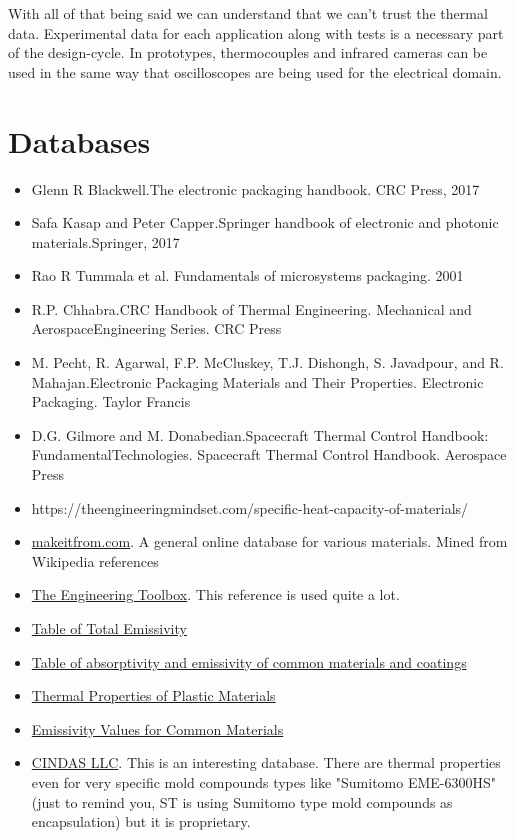 \documentclass[final]{cubedoc}
\begin{document}
	With all of that being said we can understand that we can't trust the thermal data. Experimental data for each application along with tests is a necessary part of the design-cycle. In prototypes, thermocouples and infrared cameras can be used in the same way that oscilloscopes are being used for the electrical domain.
	
	\section{Databases}\label{Databases}
	
	\begin{itemize}
		\item Glenn R Blackwell.The electronic packaging handbook.  CRC Press, 2017
		\item Safa Kasap and Peter Capper.Springer handbook of electronic and photonic materials.Springer, 2017
		\item Rao R Tummala et al.  Fundamentals of microsystems packaging.  2001
		\item R.P.  Chhabra.CRC Handbook of Thermal Engineering.   Mechanical  and  AerospaceEngineering Series. CRC Press
		\item  M. Pecht, R. Agarwal, F.P. McCluskey, T.J. Dishongh, S. Javadpour, and R. Mahajan.Electronic Packaging Materials and Their Properties.  Electronic Packaging. Taylor Francis
		\item D.G. Gilmore and M. Donabedian.Spacecraft Thermal Control Handbook: FundamentalTechnologies.  Spacecraft Thermal Control Handbook. Aerospace Press
		\item https://theengineeringmindset.com/specific-heat-capacity-of-materials/
		\item \href{https://www.makeitfrom.com/}{makeitfrom.com}. A general online database for various materials. Mined from Wikipedia references
		\item \href{https://www.engineeringtoolbox.com/}{The Engineering Toolbox}. This reference is used quite a lot.
		\item \href{https://web.archive.org/web/20200818140417/https://monarchserver.com/Files/pdf/TableofEmissivity.pdf?14860239451575071105}{Table of Total Emissivity}
		\item \href{https://web.archive.org/web/20200818140448/http://www.solarmirror.com/fom/fom-serve/cache/43.html}{Table of absorptivity and emissivity of common materials and coatings}
		\item \href{https://drive.google.com/file/d/1nZOXnBw6FdrzXW1Nm0Q7n0jfy6kBI26J/view?usp=sharing}{Thermal Properties of Plastic Materials}
		\item \href{https://web.archive.org/web/20200818140510/http://www.infrared-thermography.com/material.htm}{Emissivity Values for Common Materials}
		\item \href{https://cindasdata.com/Applications/MPMDDEMO}{CINDAS LLC}. This is an interesting database. There are thermal properties even for very specific mold compounds types like "Sumitomo EME-6300HS" (just to remind you, ST is using Sumitomo type mold compounds as encapsulation) but it is proprietary.
	\end{itemize}
	
\end{document}
